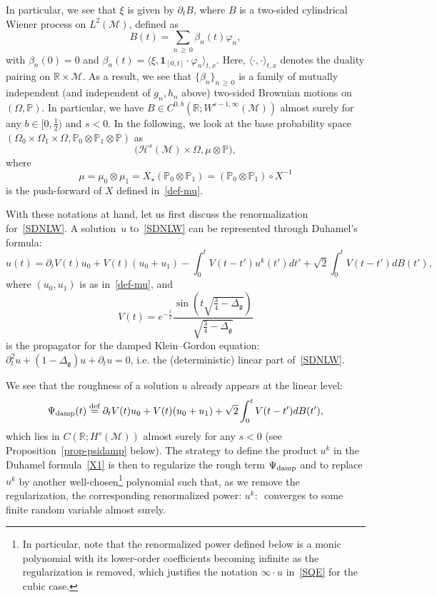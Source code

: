 \documentclass[10pt]{amsart}
\theoremstyle{definition}\newtheorem{defi}[theo]{Definition}\newtheorem{rema}[theo]{Remark}\newtheorem{exam}[theo]{Example}\newtheorem{exem}[theo]{Example}\newtheorem{nota}[theo]{Notation}
\newcommand{\damp}{\textup{damp}}
\newcommand{\R}{\mathbb{R}}
\newcommand{\Prob}{\mathbb{P}}
\newcommand{\deff}{\overset{\textup{def}}{=}}
\newcommand{\ind}{\mathbf{1}}
\newcommand{\M}{\mathcal{M}}
\renewcommand{\H}{\mathcal{H}}
\newcommand{\g}{\mathfrak{g}}
\newcommand{\be}{\beta}
\newcommand{\Dlg}{\Delta_{\g}}
\newcommand{\dt}{\partial_t}
\renewcommand{\O}{\Omega}
\newcommand{\jb}[1] {\langle #1 \rangle}
\begin{document}
In particular, we see that $\xi$ is given by $\dt B$, where $B$ is a two-sided cylindrical Wiener process on $L^2(\M)$, defined as
\begin{equation}\label{STWN}
B(t)=\sum_{n\,\geq\,0}\beta_n(t)\varphi_n,
\end{equation}
with $\be_n(0) = 0$ and $\be_n(t) = \jb{\xi, \ind_{[0, t]} \cdot \varphi_n}_{ t, x}$. Here, $\jb{\cdot, \cdot}_{t, x}$ denotes the duality pairing on $\R\times \M$. As a result, we see that $\{ \be_n \}_{n \,\ge\,0}$ is a family of mutually independent (and independent of $g_n,h_n$ above) two-sided Brownian motions on $(\O,\Prob)$. In particular, we have $B\in C^{0,b}(\R;W^{s-1,\infty}(\M))$ almost surely for any $b\in[0,\frac12)$ and $s<0$. In the following, we look at the base probability space $(\O_0\times\O_1\times\O,\Prob_0\otimes\Prob_1\otimes\Prob)$ as
\begin{equation*}
\big(\H^s(\M)\times\O,\mu\otimes\Prob\big),
\end{equation*}
where
\begin{equation*}
\mu = \mu_0\otimes\mu_1 = X_{\star}(\Prob_0\otimes\Prob_1) = (\Prob_0\otimes\Prob_1)\circ X^{-1}
\end{equation*}
is the push-forward of $X$ defined in~\eqref{def-mu}.

With these notations at hand, let us first discuss the renormalization for~\eqref{SDNLW}. A solution~$u$ to~\eqref{SDNLW} can be represented through Duhamel's formula:
\begin{equation}\label{X1}
u(t)= \dt V(t)u_0 + V(t)(u_0+u_1) - \int_0^tV(t-t')u^k(t')dt'+\sqrt{2}\int_0^tV(t-t')dB(t'),
\end{equation}
where $(u_0,u_1)$ is as in~\eqref{def-mu}, and
\begin{equation}\label{def-V}
V(t) = e^{-\frac{t}2} \frac{\sin\left(t\sqrt{\frac34-\Dlg}\right)}{\sqrt{\frac34-\Dlg}}
\end{equation}
is the propagator for the damped Klein--Gordon equation: $\dt^2 u + (1 - \Dlg) u + \dt u = 0$, i.e. the (deterministic) linear part of~\eqref{SDNLW}.

We see that the roughness of a solution $u$ already appears at the linear level:
\begin{equation}\label{def-Psidamp}
\Psi_{\damp}(t)
\deff\dt V(t)u_0 + V(t)(u_0+u_1) +\sqrt{2}\int_0^tV(t-t')dB(t'),
\end{equation}
which lies in $C(\R;H^s(\M))$ almost surely for any $s<0$ (see Proposition~\ref{prop-psidamp} below). The strategy to define the product $u^k$ in the Duhamel formula~\eqref{X1} is then to regularize the rough term $\Psi_{\damp}$ and to replace $u^k$ by another well-chosen\footnote{In particular, note that the renormalized power defined below is a monic polynomial with its lower-order coefficients becoming infinite as the regularization is removed, which justifies the notation $\infty\cdot u$ in~\eqref{SQE} for the cubic case.} polynomial such that, as we remove the regularization, the corresponding renormalized power: $\!u^{k}\!:\,$ converges to some finite random variable almost surely.
\end{document}
